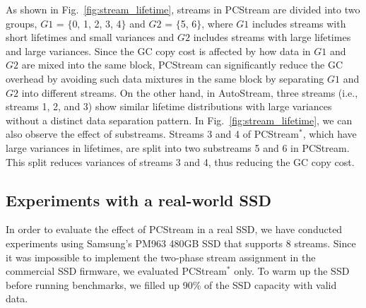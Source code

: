 As shown in Fig.~\ref{fig:stream_lifetime}, 
streams in \textsf{\small PCStream} are divided into two groups, 
$G1$ = $\{$0, 1, 2, 3, 4$\}$ and $G2$ = $\{$5, 6$\}$, 
where $G1$ includes streams with short lifetimes and small variances %
and $G2$ includes streams with large lifetimes and large variances.  %
Since the GC copy cost is affected by how data in $G1$ and $G2$ are mixed into the same block, 
\textsf{\small PCStream} can significantly reduce the GC overhead 
by avoiding such data mixtures in the same block by separating $G1$ and $G2$ into different streams. 
On the other hand, in \textsf{\small AutoStream}, 
three streams (i.e., streams 1, 2, and 3) show similar lifetime distributions with large variances 
without a distinct data separation pattern.
In Fig.~\ref{fig:stream_lifetime}, we can also observe the effect of substreams.  
Streams 3 and 4 of \textsf{\small PCStream$^{*}$}, 
which have large variances in lifetimes, are split into two substreams 5 and 6 in \textsf{\small PCStream}.
This split reduces variances of streams 3 and 4, thus reducing the GC copy cost.  %

\subsection{Experiments with a real-world SSD}

In order to evaluate the effect of \textsf{\small PCStream} in a real SSD,  
we have
conducted experiments using Samsung's PM963 480GB SSD that supports 8 streams.
Since it was impossible to implement the two-phase stream assignment in the
commercial SSD firmware, we evaluated \textsf{\small PCStream$^*$} only.  To warm up the
SSD before running benchmarks, we filled up 90\% of the SSD capacity with valid
data.

